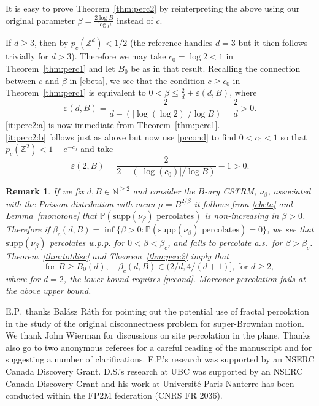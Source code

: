 \documentclass[12pt]{article}
\makeatletter
\renewenvironment{proof}[1][\proofname]{%
\par\pushQED{\qed}\normalfont%
\topsep6\p@\@plus6\p@\relax
\trivlist\item[\hskip\labelsep\bfseries#1\@addpunct{.}]%
\ignorespaces
}{%
\popQED\endtrivlist\@endpefalse
}
\numberwithin{theorem}{section}
\newtheorem{remark}[theorem]{Remark}
\theoremstyle{def}
\numberwithin{equation}{section}
\renewcommand{\P}{\mathbb{P}}
\newcommand{\Z}{\mathbb{Z}}
\newcommand{\N}{\mathbb{N}}
\newcommand{\veps}{\varepsilon}
\newcommand{\supp}{\mathrm{supp}}
\makeatother
\begin{document}
It is easy to prove Theorem~\ref{thm:perc2} by reinterpreting the above using our original parameter $\beta=\frac{2\log B}{\log\mu}$ instead of $c$.
\begin{proof}[Proof of Theorem~\ref{thm:perc2}.] If $d\ge 3$, then by \cite{CP85} $p_c(\Z^d)<1/2$ (the reference handles $d=3$ but it then follows trivially for $d>3$). Therefore we may take $c_0=\log 2<1$ in Theorem~\ref{thm:perc1} and let $B_0$ be as in that result. Recalling the connection between $c$ and $\beta$ in \eqref{cbeta}, we see that the condition $c\ge c_0$ in Theorem~\ref{thm:perc1} is equivalent to $0<\beta\le \frac{2}{d}+\veps(d,B)$, where 
\[\veps(d,B)=\frac{2}{d-(|\log(\log 2)|/\log B)}-\frac{2}{d}>0.\]
\ref{it:perc2:a} is now immediate from Theorem~\ref{thm:perc1}.\\
\noindent\ref{it:perc2:b} follows just as above but now use \eqref{pccond} to find $0<c_0<1$ so that $p_c(\Z^2)<1-e^{-c_0}$ and take 
\[\veps(2,B)=\frac{2}{2-(|\log(c_0)|/\log B)}-1>0.\]
\end{proof}

\begin{remark}\label{critpercdef}
If we fix $d,B\in\N^{\ge 2}$ and consider the $B$-ary CSTRM, $\nu_\beta$, associated with the Poisson distribution with mean $\mu=B^{2/\beta}$ it follows from \eqref{cbeta} and Lemma~\ref{monotone} that $\P(\supp(\nu_\beta)\text{ percolates})$ is non-increasing in $\beta>0$.  
		Therefore if 
		$\beta_c(d,B)=\inf\{\beta>0:\P(\supp(\nu_\beta)\text{ percolates})=0\}$, we see that $\supp(\nu_\beta)$ percolates w.p.p. for $0<\beta<\beta_c$, and fails to percolate a.s.\ for $\beta>\beta_c$.  
		Theorem~\ref{thm:totdisc} and Theorem~\ref{thm:perc2} imply that 
\begin{equation*}\text{for }B\ge B_0(d), \quad  \beta_c(d,B)\in (2/d,4/(d+1)],\ \text{for }d\ge 2,
\end{equation*}
		where for $d=2$, the lower bound requires \eqref{pccond}. Moreover  percolation fails at the above upper bound.
\end{remark}		
	E.P.\ thanks Bal\'asz R\'ath for pointing out the potential use of fractal percolation in the study of the original disconnectness problem for super-Brownian motion. 
	We thank John Wierman for discussions on site percolation in the plane.  Thanks also go to two anonymous referees for a careful reading of the manuscript and for suggesting a number of clarifications.
	E.P.'s research was supported by an NSERC Canada Discovery Grant.
	D.S.'s research at UBC was supported by an NSERC Canada Discovery Grant and his
	work at Université Paris Nanterre has been conducted within the FP2M federation (CNRS FR 2036).
\end{document}

